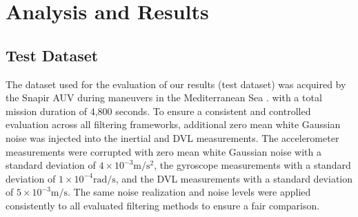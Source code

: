 \documentclass[conference]{IEEEtran}
\begin{document}
\section{Analysis and Results}
\label{sec:results}
\subsection{Test Dataset}
\noindent The dataset used for the evaluation of our results (test dataset) was acquired by the Snapir AUV during maneuvers in the Mediterranean Sea \cite{cohen2025adaptive}. with a total mission duration of 4,800 seconds. To ensure a consistent and controlled evaluation across all filtering frameworks, additional zero mean white Gaussian noise was injected into the inertial and DVL measurements. The accelerometer measurements were corrupted with zero mean white Gaussian noise with a standard deviation of $4\times10^{-3}\mathrm{m/s^2}$, the gyroscope measurements with a standard deviation of $1\times10^{-4}\mathrm{rad/s}$, and the DVL measurements with a standard deviation of $5\times10^{-3}\mathrm{m/s}$. The same noise realization and noise levels were applied consistently to all evaluated filtering methods to ensure a fair comparison. \\
\end{document}
